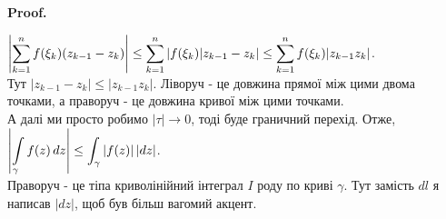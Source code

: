 \documentclass[a4paper, 10pt]{article}
\makeatletter
\def\qed{$\blacksquare$}
\theoremstyle{theoremdd}
\theoremstyle{theoremdd}
\theoremstyle{theoremdd}
\theoremstyle{theoremdd}
\theoremstyle{theoremdd}
\theoremstyle{theoremdd}
\theoremstyle{theoremdd}
\theoremstyle{theoremdd}
\renewenvironment{proof}[1][Proof.\\]{\par
\pushQED{\hfill \qed}%
\normalfont \topsep6\p@\@plus6\p@\relax
\trivlist
\item\relax
{\bfseries
#1\@addpunct{.}}\hspace\labelsep\ignorespaces
}{%
\popQED\endtrivlist\@endpefalse
}
\makeatother
\begin{document}

\begin{proof}
$\displaystyle\abs{\displaystyle\sum_{k=1}^n f(\xi_k) (z_{k-1}-z_k)} \leq \sum_{k=1}^n |f(\xi_k) |z_{k-1}-z_k| \leq \sum_{k=1}^n f(\xi_k) |z_{k-1}z_k|$.\\
Тут $|z_{k-1}-z_k| \leq |z_{k-1}z_k|$. Ліворуч - це довжина прямої між цими двома точками, а праворуч - це довжина кривої між цими точками.\\
А далі ми просто робимо $|\tau| \to 0$, тоді буде граничний перехід. Отже,\\
$\displaystyle\abs{\int\displaylimits_\gamma f(z)\,dz} \leq \int_\gamma |f(z)|\,|dz|$.\\
Праворуч - це тіпа криволінійний інтеграл $I$ роду по криві $\gamma$. Тут замість $dl$ я написав $|dz|$, щоб був більш вагомий акцент.
\end{proof}
	
\end{document}

